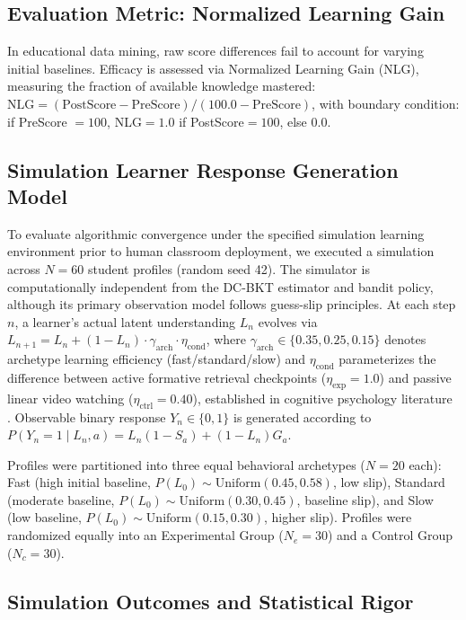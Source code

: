 \documentclass[pdflatex,sn-apa]{sn-jnl}
\begin{document}
\subsection{Evaluation Metric: Normalized Learning Gain}\label{sec5.1}

In educational data mining, raw score differences fail to account for varying initial baselines. Efficacy is assessed via Normalized Learning Gain (NLG), measuring the fraction of available knowledge mastered: $\text{NLG} = (\text{PostScore} - \text{PreScore}) / (100.0 - \text{PreScore})$, with boundary condition: if PreScore $=100$, NLG$=1.0$ if PostScore$=100$, else $0.0$.

\subsection{Simulation Learner Response Generation Model}\label{sec5.2}

To evaluate algorithmic convergence under the specified simulation learning environment prior to human classroom deployment, we executed a simulation across $N=60$ student profiles (random seed 42). The simulator is computationally independent from the DC-BKT estimator and bandit policy, although its primary observation model follows guess-slip principles. At each step $n$, a learner's actual latent understanding $L_n$ evolves via $L_{n+1} = L_n + (1-L_n) \cdot \gamma_{\text{arch}} \cdot \eta_{\text{cond}}$, where $\gamma_{\text{arch}} \in \{0.35, 0.25, 0.15\}$ denotes archetype learning efficiency (fast/standard/slow) and $\eta_{\text{cond}}$ parameterizes the difference between active formative retrieval checkpoints ($\eta_{\text{exp}}=1.0$) and passive linear video watching ($\eta_{\text{ctrl}}=0.40$), established in cognitive psychology literature \citep{karpicke2008critical,dunlosky2013improving}. Observable binary response $Y_n \in \{0,1\}$ is generated according to $P(Y_n=1 \mid L_n, a) = L_n(1-S_a) + (1-L_n)G_a$.

Profiles were partitioned into three equal behavioral archetypes ($N=20$ each): Fast (high initial baseline, $P(L_0)\sim\text{Uniform}(0.45,0.58)$, low slip), Standard (moderate baseline, $P(L_0)\sim\text{Uniform}(0.30,0.45)$, baseline slip), and Slow (low baseline, $P(L_0)\sim\text{Uniform}(0.15,0.30)$, higher slip). Profiles were randomized equally into an Experimental Group ($N_e=30$) and a Control Group ($N_c=30$).

\subsection{Simulation Outcomes and Statistical Rigor}\label{sec5.3}
\end{document}
